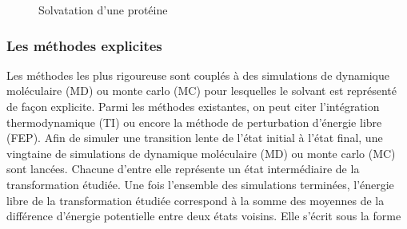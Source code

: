\begin{figure}[H]
  \center
      \caption{Solvatation d'une protéine}
      \label{fig:solvatation_def}
\end{figure}



\subsubsection{Les méthodes explicites}
Les méthodes les plus rigoureuse sont couplés à des simulations de dynamique moléculaire (MD) ou monte carlo (MC) pour lesquelles le solvant est représenté de façon explicite. Parmi les méthodes existantes\cite{Skyner_review_2015, Hansen_Practical_2014, Christ_basic_2009}, on peut citer l'intégration thermodynamique (TI) ou encore la méthode de perturbation d'énergie libre (FEP). Afin de simuler une transition lente de l'état initial à l'état final, une vingtaine de simulations de dynamique moléculaire (MD) ou monte carlo (MC) sont lancées. Chacune d'entre elle représente un état intermédiaire de la transformation étudiée. Une fois l'ensemble des simulations terminées, l'énergie libre de la transformation étudiée correspond à la somme des moyennes de la différence d'énergie potentielle entre deux états voisins. Elle s'écrit sous la forme

